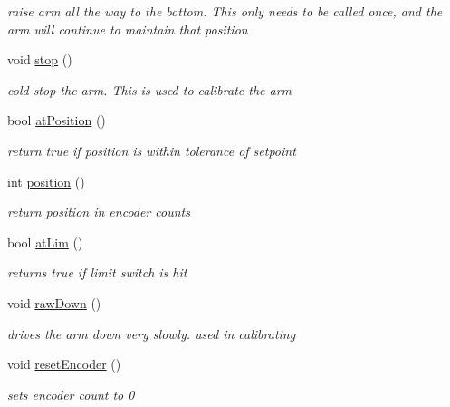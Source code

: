 \begin{DoxyCompactItemize}
\begin{DoxyCompactList}\small\item\em raise arm all the way to the bottom. This only needs to be called once, and the arm will continue to maintain that position \end{DoxyCompactList}\item 
\hypertarget{classArm_a4a8274680d981524efbeb2b51eb49c28}{void \hyperlink{classArm_a4a8274680d981524efbeb2b51eb49c28}{stop} ()}\label{classArm_a4a8274680d981524efbeb2b51eb49c28}

\begin{DoxyCompactList}\small\item\em cold stop the arm. This is used to calibrate the arm \end{DoxyCompactList}\item 
\hypertarget{classArm_ae3c0195535b15f56f9027aea0ae5ec76}{bool \hyperlink{classArm_ae3c0195535b15f56f9027aea0ae5ec76}{at\-Position} ()}\label{classArm_ae3c0195535b15f56f9027aea0ae5ec76}

\begin{DoxyCompactList}\small\item\em return true if position is within tolerance of setpoint \end{DoxyCompactList}\item 
\hypertarget{classArm_ab49756ee4bfdc5f573a78f29678bf1d8}{int \hyperlink{classArm_ab49756ee4bfdc5f573a78f29678bf1d8}{position} ()}\label{classArm_ab49756ee4bfdc5f573a78f29678bf1d8}

\begin{DoxyCompactList}\small\item\em return position in encoder counts \end{DoxyCompactList}\item 
\hypertarget{classArm_a234397ff44a8ac5fda920d92b9b33237}{bool \hyperlink{classArm_a234397ff44a8ac5fda920d92b9b33237}{at\-Lim} ()}\label{classArm_a234397ff44a8ac5fda920d92b9b33237}

\begin{DoxyCompactList}\small\item\em returns true if limit switch is hit \end{DoxyCompactList}\item 
\hypertarget{classArm_a90df7bcd3c225f6fc05ef2f77c773d2e}{void \hyperlink{classArm_a90df7bcd3c225f6fc05ef2f77c773d2e}{raw\-Down} ()}\label{classArm_a90df7bcd3c225f6fc05ef2f77c773d2e}

\begin{DoxyCompactList}\small\item\em drives the arm down very slowly. used in calibrating \end{DoxyCompactList}\item 
\hypertarget{classArm_afb44126b438f8dc00b0bf0720c84a737}{void \hyperlink{classArm_afb44126b438f8dc00b0bf0720c84a737}{reset\-Encoder} ()}\label{classArm_afb44126b438f8dc00b0bf0720c84a737}

\begin{DoxyCompactList}\small\item\em sets encoder count to 0 \end{DoxyCompactList}\end{DoxyCompactItemize}
